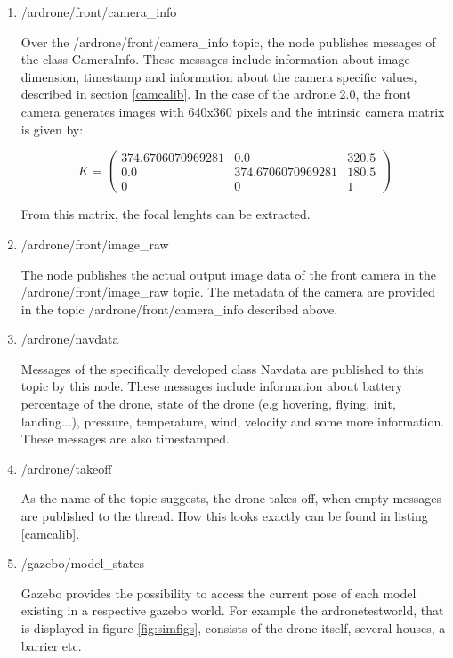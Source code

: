 	\begin{enumerate}
	
	\item{/ardrone/front/camera\_info}
	
	Over the /ardrone/front/camera\_info topic, the node publishes messages of the class CameraInfo. These messages include information about 
	image dimension, timestamp and information about the camera specific values, described in section \ref{camcalib}. In the case of the ardrone 2.0,
	the front camera generates images with 640x360 pixels and the intrinsic camera matrix is given by: 
	
	$$K = \begin{pmatrix} 374.6706070969281 & 0.0 & 320.5 \\
						  0.0 & 374.6706070969281 & 180.5 \\ 
						  0 & 0 & 1 \end{pmatrix}$$
						  
	From this matrix, the focal lenghts can be extracted. 
	
	\item{/ardrone/front/image\_raw}
	
	The node publishes the actual output image data of the front camera in the /ardrone/front/image\_raw topic. The metadata of the camera are provided in the topic /ardrone/front/camera\_info described above. 
	
	\item{/ardrone/navdata}
	
	Messages of the specifically developed class Navdata are published to this topic by this node. These messages include information about 
	battery percentage of the drone, state of the drone (e.g hovering, flying, init, landing...), pressure, temperature, wind, velocity and 
    some more information. These messages are also timestamped. 	
	
	\item{/ardrone/takeoff}
	
	As the name of the topic suggests, the drone takes off, when empty messages are published to the thread. How this looks exactly can be found in 
	listing \ref{camcalib}.
	
	\item{/gazebo/model\_states}
	
	Gazebo provides the possibility to access the current pose of each model existing in a respective gazebo world. For example the ardronetestworld, 
	that is displayed in figure \ref{fig:simfigs}, consists of the drone itself, several houses, a barrier etc.
	

\end{enumerate}
